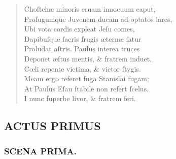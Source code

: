 \documentclass[a4paper,12pt]{article}
\begin{document}
\begin{verse}
Choſtchæ minoris eruam innocuum caput,\\[0pt]
Profugumque Juvenem ducam ad optatos lares,\\[0pt]
Ubi vota cordis expleat Jeſu comes,\\[0pt]
Dapibuſque ſacris frugis æternæ ſatur\\[0pt]
Proludat aſtris. Paulus interea truces\\[0pt]
Deponet æſtus mentis, \& fratrem induet,\\[0pt]
Cœli repente victima, \& victor ſtygis.\\[0pt]
Meam ergo referet fuga Stanislai fugam;\\[0pt]
At Paulus Eſau ſtabile non refert ſcelus.\\[0pt]
I nunc fuperbe livor, \& fratrem feri.\\[0pt]
\end{verse}

\subsection{ACTUS PRIMUS}
\label{sec:org0ce5499}
\subsubsection{SCENA PRIMA.}
\label{sec:orgb8708d1}
\end{document}
